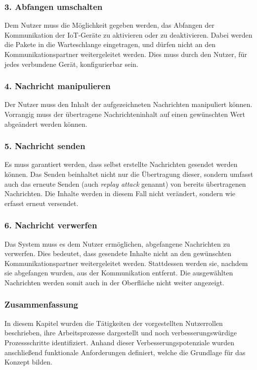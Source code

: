         \subsubsection{3. Abfangen umschalten}
        Dem Nutzer muss die Möglichkeit gegeben werden, das Abfangen der  Kommunikation der \ac{IoT}-Geräte zu aktivieren oder zu deaktivieren.
        Dabei werden die Pakete in die Warteschlange eingetragen, und dürfen nicht an den Kommunikationspartner weitergeleitet werden.
        Dies muss durch den Nutzer, für jedes verbundene Gerät, konfigurierbar sein.
        
        \subsubsection{4. Nachricht manipulieren}
        Der Nutzer muss den Inhalt der aufgezeichneten Nachrichten manipuliert können. Vorrangig muss der übertragene Nachrichteninhalt auf einen gewünschten Wert abgeändert werden können.
        
        \subsubsection{5. Nachricht senden}
        Es muss garantiert werden, dass selbst erstellte Nachrichten gesendet werden können.
        Das Senden beinhaltet nicht nur die Übertragung dieser, sondern umfasst auch das erneute Senden (auch \emph{replay attack} genannt) von bereits übertragenen Nachrichten. Die Inhalte werden in diesem Fall nicht verändert, sondern wie erfasst erneut versendet.
        
        \subsubsection{6. Nachricht verwerfen}
        Das System muss es dem Nutzer ermöglichen, abgefangene Nachrichten zu verwerfen.
        Dies bedeutet, dass gesendete Inhalte nicht an den gewünschten Kommunikationspartner weitergeleitet werden. Stattdessen werden sie, nachdem sie abgefangen wurden, aus der Kommunikation entfernt.
        Die ausgewählten Nachrichten werden somit auch in der Oberfläche nicht weiter angezeigt.
        
\subsubsection{Zusammenfassung}
    In diesem Kapitel wurden die Tätigkeiten der vorgestellten Nutzerrollen beschrieben, ihre Arbeitsprozesse dargestellt und noch verbesserungswürdige Prozessschritte identifiziert. Anhand dieser Verbesserungspotenziale wurden anschließend funktionale Anforderungen definiert, welche die Grundlage für das Konzept bilden.
